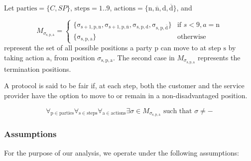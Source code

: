 \documentclass[pdftex,twocolumn,epjc3]{svjour3}
\newcommand{\normal}{\mathrm{n}}
\newcommand{\dispute}{\mathrm{d}}
\newcommand{\abnormal}{\overline{\mathrm{n}}}
\newcommand{\abdispute}{\overline{\mathrm{d}}}
\begin{document}
\begin{definition} \label{def:fairness}
Let $\mathrm{parties} = \{ C, SP \}$, $\mathrm{steps} = 1..9$, $\mathrm{actions} = \{ \normal{}, \abnormal{}, \dispute{}, \abdispute{} \}$, and 

\begin{equation}
M_{\sigma_\mathrm{s,p,a}} = 
\begin{cases} 
\{ \mathrm{\sigma_{s+1,p,\normal}}, \mathrm{\sigma_{s+1,p,\abnormal}}, \mathrm{\sigma_{s,p,\dispute}}, \mathrm{\sigma_{s,p,\abdispute}} \} & \text{if } s < 9, a = \normal{} \\
\{ \mathrm{\sigma_{s,p,a}} \} & \text{otherwise} 
\end{cases}
\end{equation}
represent the set of all possible positions a party $\mathrm{p}$ can move to at step $\mathrm{s}$ by taking action $\mathrm{a}$, from position $\sigma_\mathrm{s,p,a}$. The second case in $M_{\sigma_\mathrm{s,p,a}}$ represents the termination positions.

A protocol is said to be fair if, at each step, both the customer and the service provider have the option to move to or remain in a non-disadvantaged position.

\begin{equation}
\forall_{\mathrm{p} \in \mathrm{parties}} \forall_{\mathrm{s} \in \mathrm{steps}} \forall_{\mathrm{a} \in \mathrm{actions}} \exists \sigma \in M_{\sigma_\mathrm{s, p, a}} \text{ such that } \sigma \neq -
\end{equation}
\end{definition}


\subsubsection{Assumptions}\label{sec:assumptions}

For the purpose of our analysis, we operate under the following assumptions:
\end{document}
